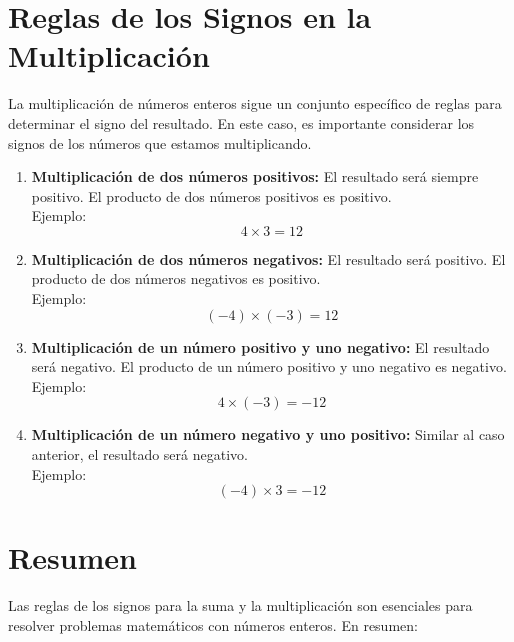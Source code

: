 \documentclass{article}
\begin{document}
\section*{Reglas de los Signos en la Multiplicación}

La multiplicación de números enteros sigue un conjunto específico de reglas para determinar el signo del resultado. En este caso, es importante considerar los signos de los números que estamos multiplicando.

\begin{enumerate}
    \item \textbf{Multiplicación de dos números positivos:} El resultado será siempre positivo. El producto de dos números positivos es positivo.\\
    Ejemplo:  
    \[
    4 \times 3 = 12
    \]

    \item \textbf{Multiplicación de dos números negativos:} El resultado será positivo. El producto de dos números negativos es positivo.\\
    Ejemplo:  
    \[
    (-4) \times (-3) = 12
    \]

    \item \textbf{Multiplicación de un número positivo y uno negativo:} El resultado será negativo. El producto de un número positivo y uno negativo es negativo.\\
    Ejemplo:  
    \[
    4 \times (-3) = -12
    \]

    \item \textbf{Multiplicación de un número negativo y uno positivo:} Similar al caso anterior, el resultado será negativo.\\
    Ejemplo:  
    \[
    (-4) \times 3 = -12
    \]
\end{enumerate}

\section*{Resumen}

Las reglas de los signos para la suma y la multiplicación son esenciales para resolver problemas matemáticos con números enteros. En resumen:
\end{document}
